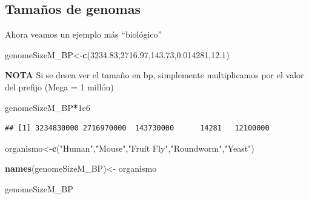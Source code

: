 \documentclass[
]{book}
\newenvironment{Shaded}{\begin{snugshade}}{\end{snugshade}}
\newcommand{\FloatTok}[1]{\textcolor[rgb]{0.00,0.00,0.81}{#1}}
\newcommand{\FunctionTok}[1]{\textcolor[rgb]{0.13,0.29,0.53}{\textbf{#1}}}
\newcommand{\NormalTok}[1]{#1}
\newcommand{\OtherTok}[1]{\textcolor[rgb]{0.56,0.35,0.01}{#1}}
\newcommand{\SpecialCharTok}[1]{\textcolor[rgb]{0.81,0.36,0.00}{\textbf{#1}}}
\newcommand{\StringTok}[1]{\textcolor[rgb]{0.31,0.60,0.02}{#1}}
\begin{document}
\subsection{Tamaños de genomas}\label{tamauxf1os-de-genomas}

Ahora veamos un ejemplo más ``biológico''

\begin{Shaded}
\begin{Highlighting}[]
\NormalTok{genomeSizeM\_BP}\OtherTok{\textless{}{-}}\FunctionTok{c}\NormalTok{(}\FloatTok{3234.83}\NormalTok{,}\FloatTok{2716.97}\NormalTok{,}\FloatTok{143.73}\NormalTok{,}\FloatTok{0.014281}\NormalTok{,}\FloatTok{12.1}\NormalTok{)}
\end{Highlighting}
\end{Shaded}

\textbf{NOTA} Si se desea ver el tamaño en bp, simplemente multiplicamos por el valor del prefijo (Mega = 1 millón)

\begin{Shaded}
\begin{Highlighting}[]
\NormalTok{genomeSizeM\_BP}\SpecialCharTok{*}\FloatTok{1e6}
\end{Highlighting}
\end{Shaded}

\begin{verbatim}
## [1] 3234830000 2716970000  143730000      14281   12100000
\end{verbatim}

\begin{Shaded}
\begin{Highlighting}[]
\NormalTok{organismo}\OtherTok{\textless{}{-}}\FunctionTok{c}\NormalTok{(}\StringTok{"Human"}\NormalTok{,}\StringTok{"Mouse"}\NormalTok{,}\StringTok{"Fruit Fly"}\NormalTok{,}\StringTok{"Roundworm"}\NormalTok{,}\StringTok{"Yeast"}\NormalTok{)}
\end{Highlighting}
\end{Shaded}

\begin{Shaded}
\begin{Highlighting}[]
\FunctionTok{names}\NormalTok{(genomeSizeM\_BP)}\OtherTok{\textless{}{-}}\NormalTok{ organismo}
\end{Highlighting}
\end{Shaded}

\begin{Shaded}
\begin{Highlighting}[]
\NormalTok{genomeSizeM\_BP}
\end{Highlighting}
\end{Shaded}
\end{document}
